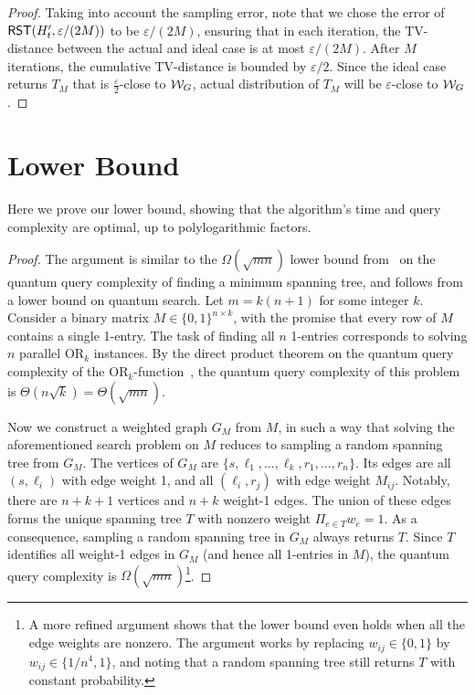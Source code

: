 \documentclass[11pt]{article}
\newcommand{\parens}[1]{( #1 )}
\begin{document}
{\begin{proof}
Taking into account the sampling error, note that we chose the error of $\RST\parens{H^{\prime}_t, \varepsilon/\parens{2M}}$ to be $\varepsilon/(2M)$, ensuring that in each iteration, the TV-distance between the actual and ideal case is at most $\varepsilon/(2M)$. After $M$ iterations, the cumulative TV-distance is bounded by $\varepsilon/2$.
Since the ideal case returns $T_M$ that is $\frac{\varepsilon}{2}$-close to $\mathcal{W}_G$, actual distribution of $T_M$ will be $\varepsilon$-close to $\mathcal{W}_G$.
\end{proof}






\section{Lower Bound}

Here we prove our lower bound, showing that the algorithm's time and query complexity are optimal, up to polylogarithmic factors.

\lowerbound*
\begin{proof}The argument is similar to the $\Omega(\sqrt{mn})$ lower bound from~\cite{DHHM06} on the quantum query complexity of finding a minimum spanning tree, and follows from a lower bound on quantum search.
Let $m = k(n+1)$ for some integer $k$.
Consider a binary matrix $M \in {\{0,1\}}^{n \times k}$, with the promise that every row of $M$ contains a single 1-entry.
The task of finding all $n$ 1-entries corresponds to solving $n$ parallel $\mathrm{OR}_k$ instances.
By the direct product theorem on the quantum query complexity of the $\mathrm{OR}_k$-function~\cite{klauck2007quantum}, the quantum query complexity of this problem is $\Theta(n \sqrt{k}) = \Theta(\sqrt{mn})$.

Now we construct a weighted graph $G_M$ from $M$, in such a way that solving the aforementioned search problem on $M$ reduces to sampling a random spanning tree from $G_M$.
The vertices of $G_M$ are $\{s,\ell_1,\dots,\ell_k,r_1,\dots,r_n\}$.
Its edges are all $(s,\ell_i)$ with edge weight 1, and all $(\ell_i,r_j)$ with edge weight $M_{ij}$.
Notably, there are $n+k+1$ vertices and $n+k$ weight-1 edges.
The union of these edges forms the unique spanning tree $T$ with nonzero weight $\Pi_{e \in T} w_e = 1$.
As a consequence, sampling a random spanning tree in $G_M$ always returns $T$.
Since $T$ identifies all weight-1 edges in $G_M$ (and hence all 1-entries in $M$), the quantum query complexity is $\Omega(\sqrt{mn})$\footnote{A more refined argument shows that the lower bound even holds when all the edge weights are nonzero.
The argument works by replacing $w_{ij} \in \{0,1\}$ by $w_{ij} \in \{1/n^4,1\}$, and noting that a random spanning tree still returns $T$ with constant probability.}.
\end{proof}

}
\end{document}
